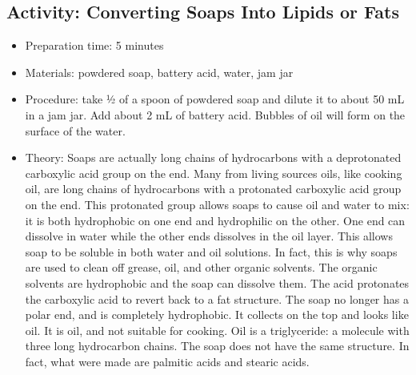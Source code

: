 \begin{itemize}
{\begin{itemize}
\begin{itemize}
{\subsection{Activity: Converting Soaps Into Lipids or Fats}
\begin{itemize}
\item{Preparation time: 5 minutes}
\item{Materials: powdered soap, battery acid, water, jam jar}
\item{Procedure: take ½ of a spoon of powdered soap and dilute it to about 50 mL in a jam jar. Add about 2 mL of battery acid. Bubbles of oil will form on the surface of the water. }
\item{Theory: Soaps are actually long chains of hydrocarbons with a deprotonated carboxylic acid group on the end. Many from living sources oils, like cooking oil, are long chains of hydrocarbons with a protonated carboxylic acid group on the end. This protonated group allows soaps to cause oil and water to mix: it is both hydrophobic on one end and hydrophilic on the other. One end can dissolve in water while the other ends dissolves in the oil layer. This allows soap to be soluble in both water and oil solutions. In fact, this is why soaps are used to clean off grease, oil, and other organic solvents. The organic solvents are hydrophobic and the soap can dissolve them. The acid protonates the carboxylic acid to revert back to a fat structure. The soap no longer has a polar end, and is completely hydrophobic. It collects on the top and looks like oil. It is oil, and not suitable for cooking. Oil is a triglyceride: a molecule with three long hydrocarbon chains. The soap does not have the same structure. In fact, what were made are palmitic acids and stearic acids. }
\end{itemize}

}
\end{itemize}
\end{itemize}}
\end{itemize}
